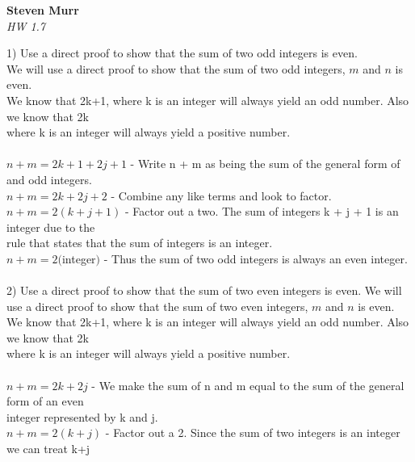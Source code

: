\documentclass{article}
\begin{document}
\setcounter{totalnumber}{5}
   \begin{flushright}
      \Large\textbf{Steven Murr}\\
      \large\textit{HW 1.7}
   \end{flushright}
\begin{flushleft}
\makeatletter%
\setlength{\@fptop}{5pt}
\makeatother
\setlength\parindent{0pt}1) Use a direct proof to show that the sum of two odd integers is even.\\
\setlength\parindent{24pt} We will use a direct proof to show that the sum of two odd integers, $m$ and $n$ is even.\\
\setlength\parindent{24pt} We know that 2k+1, where k is an integer will always yield an odd number.  Also we know that 2k \\
where k is an integer will always yield a positive number.\\
~\\\setlength\parindent{24pt}$n + m = 2k+1 + 2j+1$ - Write n + m as being the sum of the general form of and odd integers.\\
\setlength\parindent{24pt}$n + m = 2k + 2j + 2$ - Combine any like terms and look to factor.\\
\setlength\parindent{24pt}$n + m = 2(k + j + 1)$ - Factor out a two.  The sum of integers k + j + 1 is an integer due to the \\
rule that states that the sum of integers is an integer.\\
\setlength\parindent{24pt}$n + m = 2($integer$)$ - Thus the sum of two odd integers is always an even integer.\\
~\\
\setlength\parindent{0pt}2) Use a direct proof to show that the sum of two even integers is even.
\setlength\parindent{24pt} We will use a direct proof to show that the sum of two even integers, $m$ and $n$ is even.\\
\setlength\parindent{24pt} We know that 2k+1, where k is an integer will always yield an odd number.  Also we know that 2k \\
where k is an integer will always yield a positive number.\\
~\\
\setlength\parindent{24pt}$n + m = 2k + 2j$ - We make the sum of n and m equal to the sum of the general form of an even \\
integer represented by k and j. \\
\setlength\parindent{24pt}$n + m = 2(k + j)$ - Factor out a 2.  Since the sum of two integers is an integer we can treat k+j \\

\end{flushleft}
\end{document}
